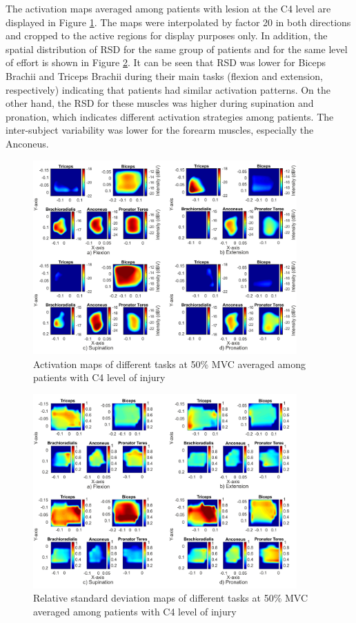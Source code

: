 The activation maps averaged among patients with lesion at the C4 level are displayed in Figure \ref{fig:2-3}. The maps were interpolated by factor 20 in both directions and cropped to the active regions for display purposes only. In addition, the spatial distribution of RSD for the same group of patients and for the same level of effort is shown in Figure \ref{fig:2-4}. It can be seen that RSD was lower for Biceps Brachii and Triceps Brachii during their main tasks (flexion and extension, respectively) indicating that patients had similar activation patterns. On the other hand, the RSD for these muscles was higher during supination and pronation, which indicates different activation strategies among patients. The inter-subject variability was lower for the forearm muscles, especially the Anconeus.

\begin{figure}[ht]
\centering
\includegraphics[width=0.9\textwidth]{Images/figure2_3.png}
\caption{Activation maps of different tasks at 50\% MVC averaged among patients with C4 level of injury}
\label{fig:2-3}
\end{figure}      

\begin{figure}[ht]
\centering
\includegraphics[width=0.9\textwidth]{Images/figure2_4.png}
\caption{Relative standard deviation maps of different tasks at 50\% MVC averaged among patients with C4 level of injury}
\label{fig:2-4}
\end{figure} 


